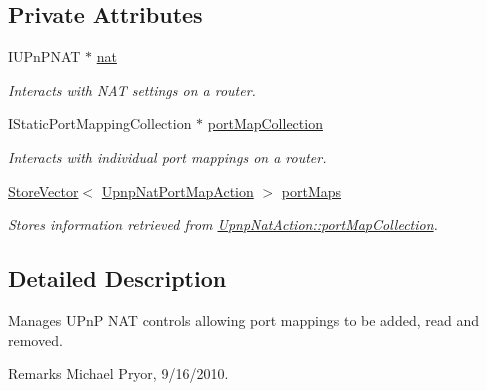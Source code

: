 \subsection*{Private Attributes}
\begin{DoxyCompactItemize}
\item 
\hypertarget{class_upnp_nat_action_ace2edec11f378b957553d585976559ef}{
IUPnPNAT $\ast$ \hyperlink{class_upnp_nat_action_ace2edec11f378b957553d585976559ef}{nat}}
\label{class_upnp_nat_action_ace2edec11f378b957553d585976559ef}

\begin{DoxyCompactList}\small\item\em Interacts with NAT settings on a router. \item\end{DoxyCompactList}\item 
\hypertarget{class_upnp_nat_action_ad39607309f300cd4f7c92c50bfffe978}{
IStaticPortMappingCollection $\ast$ \hyperlink{class_upnp_nat_action_ad39607309f300cd4f7c92c50bfffe978}{portMapCollection}}
\label{class_upnp_nat_action_ad39607309f300cd4f7c92c50bfffe978}

\begin{DoxyCompactList}\small\item\em Interacts with individual port mappings on a router. \item\end{DoxyCompactList}\item 
\hypertarget{class_upnp_nat_action_a362936deeb259b37083160bd013cb709}{
\hyperlink{class_store_vector}{StoreVector}$<$ \hyperlink{class_upnp_nat_port_map_action}{UpnpNatPortMapAction} $>$ \hyperlink{class_upnp_nat_action_a362936deeb259b37083160bd013cb709}{portMaps}}
\label{class_upnp_nat_action_a362936deeb259b37083160bd013cb709}

\begin{DoxyCompactList}\small\item\em Stores information retrieved from \hyperlink{class_upnp_nat_action_ad39607309f300cd4f7c92c50bfffe978}{UpnpNatAction::portMapCollection}. \item\end{DoxyCompactList}\end{DoxyCompactItemize}


\subsection{Detailed Description}
Manages UPnP NAT controls allowing port mappings to be added, read and removed. \begin{DoxyRemark}{Remarks}
Michael Pryor, 9/16/2010. 
\end{DoxyRemark}


